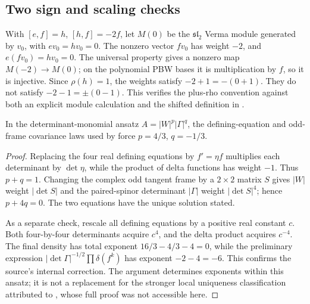 \subsection{Two sign and scaling checks}

\begin{example}\ours
With \([e,f]=h\), \([h,f]=-2f\), let \(M(0)\) be the \(\mathfrak{sl}_2\) Verma module generated by \(v_0\), with \(ev_0=hv_0=0\). The nonzero vector \(fv_0\) has weight \(-2\), and \(e(fv_0)=hv_0=0\). The universal property gives a nonzero map \(M(-2)\to M(0)\); on the polynomial PBW bases it is multiplication by \(f\), so it is injective. Since \(\rho(h)=1\), the weights satisfy \(-2+1=-(0+1)\). They do not satisfy \(-2-1=\pm(0-1)\). This verifies the plus-rho convention against both an explicit module calculation and the shifted definition in \citet[\S3]{bernsteingelfandgelfand1971structure}.
\end{example}

\begin{proposition}\ours
In the determinant-monomial ansatz \(A=|W|^p|\Gamma|^q\), the defining-equation and odd-frame covariance laws used by \citet[\S3, equation (8)]{schwarz1982supergravity} force \(p=4/3\), \(q=-1/3\).
\end{proposition}
\begin{proof}
Replacing the four real defining equations by \(f'=\eta f\) multiplies each determinant by \(\det\eta\), while the product of delta functions has weight \(-1\). Thus \(p+q=1\). Changing the complex odd tangent frame by a \(2\times2\) matrix \(S\) gives \(|W|\) weight \(|\det S|\) and the paired-spinor determinant \(|\Gamma|\) weight \(|\det S|^4\); hence \(p+4q=0\). The two equations have the unique solution stated.

As a separate check, rescale all defining equations by a positive real constant \(c\). Both four-by-four determinants acquire \(c^4\), and the delta product acquires \(c^{-4}\). The final density has total exponent \(16/3-4/3-4=0\), while the preliminary expression \(|\det\Gamma|^{-1/2}\prod\delta(f^k)\) has exponent \(-2-4=-6\). This confirms the source's internal correction. The argument determines exponents within this ansatz; it is not a replacement for the stronger local uniqueness classification attributed to \citet{gaydukromanovschwarz1981democracy}, whose full proof was not accessible here.
\end{proof}

